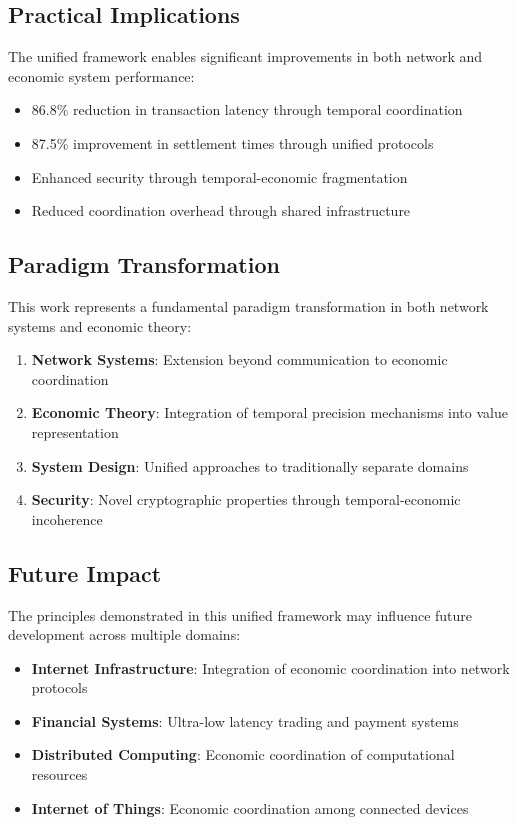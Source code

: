 \documentclass[12pt,a4paper]{article}
\begin{document}
\subsection{Practical Implications}

The unified framework enables significant improvements in both network and economic system performance:

\begin{itemize}
\item 86.8\% reduction in transaction latency through temporal coordination
\item 87.5\% improvement in settlement times through unified protocols
\item Enhanced security through temporal-economic fragmentation
\item Reduced coordination overhead through shared infrastructure
\end{itemize}

\subsection{Paradigm Transformation}

This work represents a fundamental paradigm transformation in both network systems and economic theory:

\begin{enumerate}
\item \textbf{Network Systems}: Extension beyond communication to economic coordination
\item \textbf{Economic Theory}: Integration of temporal precision mechanisms into value representation
\item \textbf{System Design}: Unified approaches to traditionally separate domains
\item \textbf{Security}: Novel cryptographic properties through temporal-economic incoherence
\end{enumerate}

\subsection{Future Impact}

The principles demonstrated in this unified framework may influence future development across multiple domains:

\begin{itemize}
\item \textbf{Internet Infrastructure}: Integration of economic coordination into network protocols
\item \textbf{Financial Systems}: Ultra-low latency trading and payment systems
\item \textbf{Distributed Computing}: Economic coordination of computational resources
\item \textbf{Internet of Things}: Economic coordination among connected devices
\end{itemize}
\end{document}
